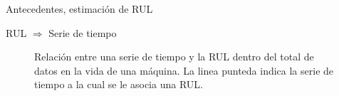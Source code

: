 \begin{frame}{Antecedentes, estimación de RUL}
\begin{block}{RUL $\Rightarrow$ Serie de tiempo}
\begin{figure}[!h]
		\caption{Relación entre una serie de tiempo y la RUL dentro del total de datos en la vida de una máquina. La linea punteda indica la serie de tiempo a la cual se le asocia una RUL.}
		\label{CNN}
\end{figure}
    \end{block}
\end{frame}



